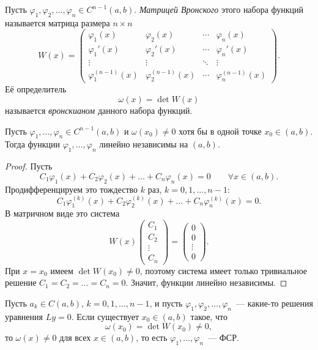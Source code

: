 \documentclass[12pt]{article}
\begin{document}
	\begin{definition}
		Пусть $\varphi_1, \varphi_2, \dots, \varphi_n \in C^{n-1}(a, b)$. \emph{Матрицей Вронского} этого набора функций называется матрица размера $n \times n$
		\[
			W(x) =
			\begin{pmatrix}
				\varphi_1(x) & \varphi_2(x) & \cdots & \varphi_n(x) \\[2pt]
				\varphi_1'(x) & \varphi_2'(x) & \cdots & \varphi_n'(x) \\[2pt]
				\vdots & \vdots & \ddots & \vdots \\[2pt]
				\varphi_1^{(n-1)}(x) & \varphi_2^{(n-1)}(x) & \cdots & \varphi_n^{(n-1)}(x)
			\end{pmatrix}.
		\]
		Её определитель
		\[
			\omega(x) = \det W(x)
		\]
		называется \emph{вронскианом} данного набора функций.
	\end{definition}

	\begin{statement}
		Пусть $\varphi_1, \dots, \varphi_n \in C^{n-1}(a, b)$ и $\omega(x_0) \ne 0$ хотя бы в одной точке $x_0 \in (a, b)$. Тогда функции $\varphi_1, \dots, \varphi_n$ линейно независимы на $(a, b)$.
	\end{statement}

	\begin{proof}
		Пусть
		\[
			C_1 \varphi_1(x) + C_2 \varphi_2(x) + \dots + C_n \varphi_n(x) = 0 \qquad \forall x \in (a, b).
		\]
		Продифференцируем это тождество $k$ раз, $k = 0, 1, \dots, n - 1$:
		\[
			C_1 \varphi_1^{(k)}(x) + C_2 \varphi_2^{(k)}(x) + \dots + C_n \varphi_n^{(k)}(x) = 0.
		\]
		В матричном виде это система
		\[
			W(x)
			\begin{pmatrix}
				C_1 \\ C_2 \\ \vdots \\ C_n
			\end{pmatrix}
			=
			\begin{pmatrix}
				0 \\ 0 \\ \vdots \\ 0
			\end{pmatrix}.
		\]
		При $x = x_0$ имеем $\det W(x_0) \ne 0$, поэтому система имеет только тривиальное решение $C_1 = C_2 = \dots = C_n = 0$. Значит, функции линейно независимы.
	\end{proof}

	\begin{theorem}
		Пусть $a_k \in C(a, b)$, $k = 0, 1, \dots, n-1$, и пусть $\varphi_1, \varphi_2, \dots, \varphi_n$~--- какие-то решения уравнения $Ly = 0$. Если существует $x_0 \in (a, b)$ такое, что
		\[
			\omega(x_0) = \det W(x_0) \ne 0,
		\]
		то $\omega(x) \ne 0$ для всех $x \in (a, b)$, то есть $\varphi_1, \dots, \varphi_n$~--- ФСР.
	\end{theorem}
\end{document}
